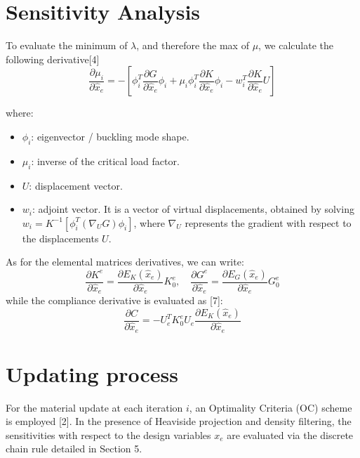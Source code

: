 \documentclass{article}
\begin{document}
\section{Sensitivity Analysis}

\noindent To evaluate the minimum of $\lambda$, and therefore the max of $\mu$, we calculate the following derivative[4]
\begin{equation}
\frac{\partial \mu_i}{\partial \hat{x}_e} = -\left[ \phi_i^T \frac{\partial G}{\partial \hat{x}_e} \phi_i + \mu_i \phi_i^T \frac{\partial K}{\partial \hat{x}_e} \phi_i - w_i^T \frac{\partial K}{\partial \hat{x}_e} U \right]
\end{equation}

where:
\begin{itemize}
    \item $\phi_i$: eigenvector / buckling mode shape.
    \item $\mu_i$: inverse of the critical load factor.
    \item $U$: displacement vector.
    \item $w_i$: adjoint vector. It is a vector of virtual displacements, obtained by solving $w_i = K^{-1}[\phi_i^T (\nabla_U G)\phi_i]$, where $\nabla_U$ represents the gradient with respect to the displacements $U$.
\end{itemize}
\noindent As for the elemental matrices derivatives, we can write:
\begin{equation}
\frac{\partial K^e}{\partial \hat{x}_e} = \frac{\partial E_K(\hat{x}_e)}{\partial \hat{x}_e} K_0^e, \quad \frac{\partial G^e}{\partial \hat{x}_e} = \frac{\partial E_G(\hat{x}_e)}{\partial \hat{x}_e} G_0^e
\end{equation}
\noindent while the compliance derivative is evaluated as [7]:
\begin{equation}
\frac{\partial C}{\partial \hat{x}_e} = -U_e^T K_0^e U_e \frac{\partial E_K(\hat{x}_e)}{\partial \hat{x}_e}
\end{equation}

\section{Updating process}

\noindent For the material update at each iteration $i$, an Optimality Criteria (OC) scheme is employed [2]. In the presence of Heaviside projection and density filtering, the sensitivities with respect to the design variables $x_e$ are evaluated via the discrete chain rule detailed in Section 5.
\end{document}
